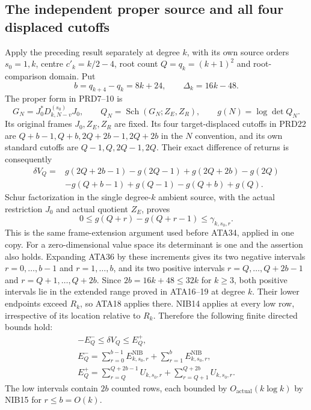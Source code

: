 \subsection{The independent proper source and all four displaced cutoffs}
Apply the preceding result separately at degree $k$, with its own
source orders $s_0=1,k$, centre $c'_k=k/2-4$, root count
$Q=q_k=(k+1)^2$ and root-comparison domain.  Put
\[
 b=q_{k+4}-q_k=8k+24,\qquad\Delta_k=16k-48.
\]
The proper form in PRD7--10 is
\[
 G_N=J_0^*D_{k,N-v}^{(s_0)}J_0,\qquad
 Q_N=\operatorname{Sch}(G_N;Z_E,Z_R),\qquad g(N)=\log\det Q_N.
                                                               \tag{ATA35}
\]
Its original frames $J_0,Z_E,Z_R$ are fixed.  Its four target-displaced
cutoffs in PRD22 are $Q+b-1,Q+b,2Q+2b-1,2Q+2b$ in the $N$
convention, and its own standard cutoffs are $Q-1,Q,2Q-1,2Q$.
Their exact difference of returns is consequently
\[
\begin{split}
 \delta V_Q={}&g(2Q+2b-1)-g(2Q-1)+g(2Q+2b)-g(2Q)\\
              &-g(Q+b-1)+g(Q-1)-g(Q+b)+g(Q).
\end{split}\tag{ATA36}
\]
Schur factorization in the single degree-$k$ ambient source, with
the actual restriction $J_0$ and actual quotient $Z_E$, proves
\[
 0\le g(Q+r)-g(Q+r-1)\le\gamma_{k,s_0,r}.              \tag{ATA37}
\]
This is the same frame-extension argument used before ATA34, applied
in one copy.  For a zero-dimensional value space its determinant is
one and the assertion also holds.
Expanding ATA36 by these increments gives its two negative intervals
$r=0,\ldots,b-1$ and $r=1,\ldots,b$, and its two positive intervals
$r=Q,\ldots,Q+2b-1$ and $r=Q+1,\ldots,Q+2b$.
Since $2b=16k+48\le32k$ for $k\ge3$, both positive intervals lie in
the extended range proved in ATA16--19 at degree $k$.
Their lower endpoints exceed $R_k$, so ATA18 applies there.
NIB14 applies at every low row, irrespective of its location relative
to $R_k$.  Therefore the following finite directed bounds hold:
\[
\begin{gathered}
 -E_Q^-\le\delta V_Q\le E_Q^+,\\
 E_Q^- =\sum_{r=0}^{b-1}E^{\mathrm{NIB}}_{k,s_0,r}
                   +\sum_{r=1}^{b}E^{\mathrm{NIB}}_{k,s_0,r},\\
 E_Q^+ =\sum_{r=Q}^{Q+2b-1}U_{k,s_0,r}
                   +\sum_{r=Q+1}^{Q+2b}U_{k,s_0,r}.
\end{gathered}\tag{ATA38}
\]
The low intervals contain $2b$ counted rows, each bounded by
$O_{\mathrm{actual}}(k\log k)$ by NIB15 for $r\le b=O(k)$.
